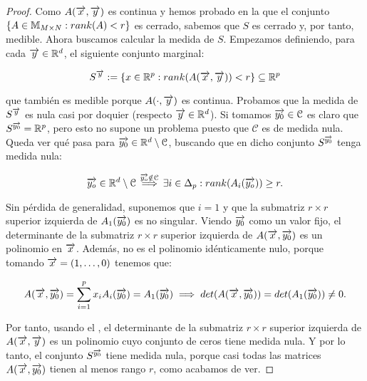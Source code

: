 \begin{proof}

    Como $A(\overrightarrow{x}, \overrightarrow{y})$ es continua y hemos probado en la  que el conjunto $\{ A \in \mathbb{M}_{M \times N}: rank(A) < r \}$ es cerrado, sabemos que $S$ es cerrado y, por tanto, medible. Ahora buscamos calcular la medida de $S$. Empezamos definiendo, para cada $\overrightarrow{y} \in \mathbb{R}^d$, el siguiente conjunto marginal:

    \begin{equation}
        S^{\overrightarrow{y}} := \{ x \in \mathbb{R}^p: rank(A(\overrightarrow{x}, \overrightarrow{y})) < r \} \subseteq \mathbb{R}^p
    \end{equation}

    que también es medible porque $A(\cdot, \overrightarrow{y})$ es continua. Probamos que la medida de $S^{\overrightarrow{y}}$ es nula casi por doquier (respecto $\overrightarrow{y} \in \mathbb{R}^d$). Si tomamos $\overrightarrow{y_0} \in \mathcal{C}$ es claro que $S^{\overrightarrow{y_0}} = \mathbb{R}^p$, pero esto no supone un problema puesto que $\mathcal{C}$ es de medida nula. Queda ver qué pasa para $\overrightarrow{y_0} \in \mathbb{R}^d \setminus \mathcal{C}$, buscando que en dicho conjunto $S^{\overrightarrow{y_0}}$ tenga medida nula:

    \begin{equation}
        \overrightarrow{y_o} \in \mathbb{R}^d \setminus \mathcal{C} \stackrel{\overrightarrow{y_o} \notin \mathcal{C}}{\implies} \exists i \in \Delta_{p}: rank(A_i(\overrightarrow{y_o})) \geq r.
    \end{equation}

    Sin pérdida de generalidad, suponemos que $i = 1$ y que la submatriz $r \times r$ superior izquierda de $A_1(\overrightarrow{y_0})$ es no singular. Viendo $\overrightarrow{y_0}$ como un valor fijo, el determinante de la submatriz $r \times r$ superior izquierda de $A(\overrightarrow{x}, \overrightarrow{y_0})$ es un polinomio en $\overrightarrow{x}$. Además, no es el polinomio idénticamente nulo, porque tomando $\overrightarrow{x} = (1, \ldots, 0)$ tenemos que:

    \begin{equation}
        A(\overrightarrow{x}, \overrightarrow{y_0}) = \sum_{i = 1}^{p} x_i A_i(\overrightarrow{y_0}) = A_1(\overrightarrow{y_0}) \implies det(A(\overrightarrow{x}, \overrightarrow{y_0})) = det(A_1(\overrightarrow{y_0})) \neq 0.
    \end{equation}

    Por tanto, usando el , el determinante de la submatriz $r \times r$ superior izquierda de $A(\overrightarrow{x}, \overrightarrow{y})$ es un polinomio cuyo conjunto de ceros tiene medida nula. Y por lo tanto, el conjunto $S^{\overrightarrow{y_0}}$ tiene medida nula, porque casi todas las matrices $A(\overrightarrow{x}, \overrightarrow{y_0})$ tienen al menos rango $r$, como acabamos de ver.


\end{proof}

